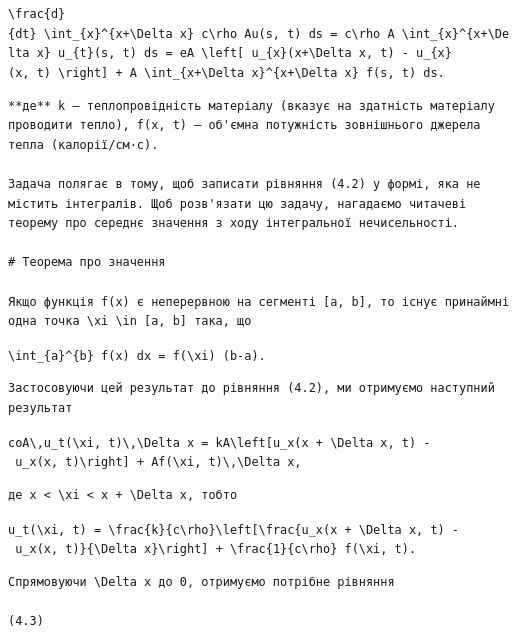 \documentclass[
  ukrainian,
]{article}
\begin{document}
\texttt{\textbackslash{}frac\{d\}\{dt\}\ \textbackslash{}int\_\{x\}\^{}\{x+\textbackslash{}Delta\ x\}\ c\textbackslash{}rho\ Au(s,\ t)\ ds\ =\ c\textbackslash{}rho\ A\ \textbackslash{}int\_\{x\}\^{}\{x+\textbackslash{}Delta\ x\}\ u\_\{t\}(s,\ t)\ ds\ =\ eA\ \textbackslash{}left{[}\ u\_\{x\}(x+\textbackslash{}Delta\ x,\ t)\ -\ u\_\{x\}(x,\ t)\ \textbackslash{}right{]}\ +\ A\ \textbackslash{}int\_\{x+\textbackslash{}Delta\ x\}\^{}\{x+\textbackslash{}Delta\ x\}\ f(s,\ t)\ ds.}

\begin{verbatim}
**де** k — теплопровідність матеріалу (вказує на здатність матеріалу проводити тепло), f(x, t) — об'ємна потужність зовнішнього джерела тепла (калорії/см·с).

Задача полягає в тому, щоб записати рівняння (4.2) у формі, яка не містить інтегралів. Щоб розв'язати цю задачу, нагадаємо читачеві теорему про середнє значення з ходу інтегральної нечисельності.

# Теорема про значення

Якщо функція f(x) є неперервною на сегменті [a, b], то існує принаймні одна точка \xi \in [a, b] така, що
\end{verbatim}

\texttt{\textbackslash{}int\_\{a\}\^{}\{b\}\ f(x)\ dx\ =\ f(\textbackslash{}xi)\ (b-a).}

\begin{verbatim}
Застосовуючи цей результат до рівняння (4.2), ми отримуємо наступний результат
\end{verbatim}

\texttt{coA\textbackslash{},u\_t(\textbackslash{}xi,\ t)\textbackslash{},\textbackslash{}Delta\ x\ =\ kA\textbackslash{}left{[}u\_x(x\ +\ \textbackslash{}Delta\ x,\ t)\ -\ u\_x(x,\ t)\textbackslash{}right{]}\ +\ Af(\textbackslash{}xi,\ t)\textbackslash{},\textbackslash{}Delta\ x,}

\begin{verbatim}
де x < \xi < x + \Delta x, тобто
\end{verbatim}

\texttt{u\_t(\textbackslash{}xi,\ t)\ =\ \textbackslash{}frac\{k\}\{c\textbackslash{}rho\}\textbackslash{}left{[}\textbackslash{}frac\{u\_x(x\ +\ \textbackslash{}Delta\ x,\ t)\ -\ u\_x(x,\ t)\}\{\textbackslash{}Delta\ x\}\textbackslash{}right{]}\ +\ \textbackslash{}frac\{1\}\{c\textbackslash{}rho\}\ f(\textbackslash{}xi,\ t).}

\begin{verbatim}
Спрямовуючи \Delta x до 0, отримуємо потрібне рівняння

(4.3)
\end{verbatim}
\end{document}
